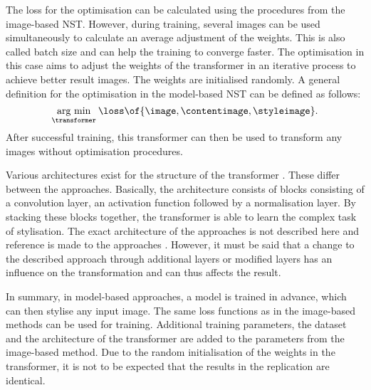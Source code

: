The loss for the optimisation can be calculated using the procedures from the image-based \gls{NST}. However, during training, several images can be used simultaneously to calculate an average adjustment of the weights. This is also called batch size and can help the training to converge faster. The optimisation in this case aims to adjust the weights of the transformer in an iterative process to achieve better result images. The weights are initialised randomly. A general definition for the optimisation in the model-based \gls{NST} can be defined as follows:
\begin{equation*}
	\argmin{\transformer}{\loss\of{\image\eqcommasep \contentimage\eqcommasep \styleimage}} \eqtextdot
\end{equation*} 
After successful training, this transformer can then be used to transform any images without optimisation procedures.

Various architectures exist for the structure of the transformer \transformer{}. These differ between the approaches. Basically, the architecture consists of blocks consisting of a convolution layer, an activation function followed by a normalisation layer. By stacking these blocks together, the transformer is able to learn the complex task of stylisation. The exact architecture of the approaches is not described here and reference is made to the approaches \cite{JAL2016,ULVL2016,UVL2017,SKLO2018}. However, it must be said that a change to the described approach through additional layers or modified layers has an influence on the transformation and can thus affects the result.

In summary, in model-based approaches, a model is trained in advance, which can then stylise any input image. The same loss functions as in the image-based methods can be used for training. Additional training parameters, the dataset and the architecture of the transformer are added to the parameters from the image-based method. Due to the random initialisation of the weights in the transformer, it is not to be expected that the results in the replication are identical.
